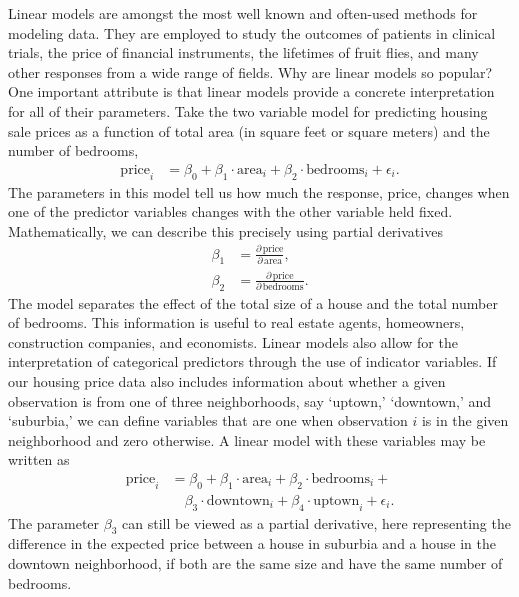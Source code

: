 \documentclass[12pt,hidelinks]{article}
\numberwithin{equation}{section}
\begin{document}
Linear models are amongst the most well known and often-used methods for
modeling data. They are employed to study the
outcomes of patients in clinical trials, the price of financial
instruments, the lifetimes of fruit flies, and many other
responses from a wide range of fields.
Why are linear models so popular? One important attribute is that
linear models provide a concrete interpretation for all of their
parameters. Take the two variable model for predicting housing sale
prices as a function of total area (in square feet or square meters)
and the number of bedrooms,
\begin{align}
\text{price}_i &= \beta_0 + \beta_1 \cdot \text{area}_i + \beta_2 \cdot \text{bedrooms}_i + \epsilon_i.
\end{align}
The parameters in this model tell us how much the response, price,
changes when one of the predictor variables changes with the other
variable held fixed. Mathematically, we can describe this precisely
using partial derivatives
\begin{align}
\beta_1 &= \frac{\partial \, \text{price}}{\partial \, \text{area}}, \\
\beta_2 &= \frac{\partial \, \text{price}}{\partial \, \text{bedrooms}}.
\end{align}
The model separates the effect of the total size of a house and the
total number of bedrooms. This information is useful to real estate
agents, homeowners, construction companies, and economists.
Linear models also allow for the interpretation of categorical predictors
through the use of indicator variables. If our housing price data also
includes information about whether a given observation is from one of
three neighborhoods, say `uptown,' `downtown,' and `suburbia,' we can
define variables that are one when observation $i$ is in the given
neighborhood and zero otherwise. A linear model with these variables
may be written as
\begin{align}
\text{price}_i &= \beta_0 + \beta_1 \cdot \text{area}_i + \beta_2 \cdot \text{bedrooms}_i + \\ \nonumber
              & \quad  \beta_3 \cdot \text{downtown}_i + \beta_4 \cdot \text{uptown}_i + \epsilon_i.
\end{align}
The parameter $\beta_3$ can still be viewed as a partial derivative, here
representing the difference in the expected price between a house in suburbia
and a house in the downtown neighborhood, if both are the same size and have
the same number of bedrooms.
\end{document}
